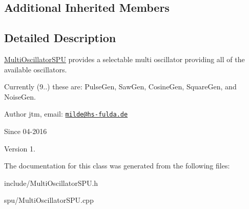 \subsection*{Additional Inherited Members}


\subsection{Detailed Description}
\hyperlink{classMultiOscillatorSPU}{Multi\-Oscillator\-S\-P\-U} provides a selectable multi oscillator providing all of the available oscillators.

Currently (9..) these are\-: Pulse\-Gen, Saw\-Gen, Cosine\-Gen, Square\-Gen, and Noise\-Gen.

\begin{DoxyAuthor}{Author}
jtm, email\-:  \href{mailto:milde@hs-fulda.de}{\tt milde@hs-\/fulda.\-de} 
\end{DoxyAuthor}
\begin{DoxySince}{Since}
04-\/2016 
\end{DoxySince}
\begin{DoxyVersion}{Version}
1. 
\end{DoxyVersion}


The documentation for this class was generated from the following files\-:\begin{DoxyCompactItemize}
\item 
include/Multi\-Oscillator\-S\-P\-U.\-h\item 
spu/Multi\-Oscillator\-S\-P\-U.\-cpp\end{DoxyCompactItemize}
